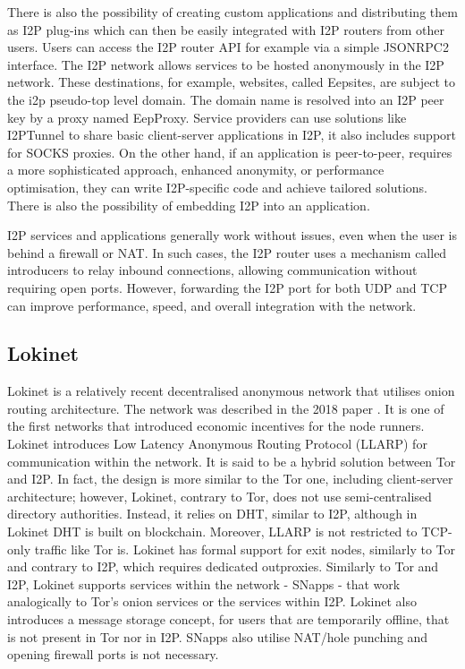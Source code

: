 There is also the possibility of creating custom applications and distributing them as I2P plug-ins which can then be easily integrated with I2P routers from other users. Users can access the I2P router API for example via a simple JSONRPC2 interface. 
The I2P network allows services to be hosted anonymously in the I2P network. These destinations, for example, websites, called Eepsites, are subject to the i2p pseudo-top level domain. The domain name is resolved into an I2P peer key by a proxy named EepProxy. Service providers can use solutions like I2PTunnel to share basic client-server applications in I2P, it also includes support for SOCKS proxies. On the other hand, if an application is peer-to-peer, requires a more sophisticated approach, enhanced anonymity, or performance optimisation, they can write I2P-specific code and achieve tailored solutions. There is also the possibility of embedding I2P into an application.

I2P services and applications generally work without issues, even when the user is behind a firewall or NAT. In such cases, the I2P router uses a mechanism called introducers to relay inbound connections, allowing communication without requiring open ports. However, forwarding the I2P port for both UDP and TCP can improve performance, speed, and overall integration with the network.

\subsection{Lokinet}
Lokinet is a relatively recent decentralised anonymous network that utilises onion routing architecture. The network was described in the 2018 paper \cite{loki}. It is one of the first networks that introduced economic incentives for the node runners. Lokinet introduces Low Latency Anonymous Routing Protocol (LLARP) for communication within the network. It is said to be a hybrid solution between Tor and I2P. In fact, the design is more similar to the Tor one, including client-server architecture; however, Lokinet, contrary to Tor, does not use semi-centralised directory authorities. Instead, it relies on DHT, similar to I2P, although in Lokinet DHT is built on blockchain. Moreover, LLARP is not restricted to TCP-only traffic like Tor is. Lokinet has formal support for exit nodes, similarly to Tor and contrary to I2P, which requires dedicated outproxies. Similarly to Tor and I2P, Lokinet supports services within the network - SNapps - that work analogically to Tor’s onion services or the services within I2P. Lokinet also introduces a message storage concept, for users that are temporarily offline, that is not present in Tor nor in I2P. SNapps also utilise NAT/hole punching and opening firewall ports is not necessary.

